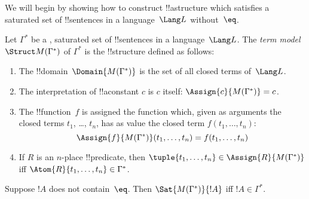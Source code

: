\documentclass[../../../include/open-logic-section]{subfiles}
\begin{document}


We will begin by showing how to construct !!a{structure} which
satisfies a
saturated set of !!{sentence}s in a language~$\Lang L$ without~$\eq$.

\begin{defn}
Let $\Gamma^*$ be a
,
saturated set of !!{sentence}s in a language~$\Lang L$. The \emph{term
  model}~$\Struct M(\Gamma^*)$ of $\Gamma^*$ is the !!{structure}
defined as follows:
\begin{enumerate}
\item The !!{domain}~$\Domain{M(\Gamma^*)}$ is the set of all closed terms
  of~$\Lang L$.
\item The interpretation of !!a{constant} $c$ is $c$ itself:
  $\Assign{c}{M(\Gamma^*)} = c$.
\item The !!{function}~$f$ is assigned the function which, given as
  arguments the closed terms $t_1$, \dots, $t_n$, has as value the
  closed term $f(t_1, \dots, t_n)$:
\[
\Assign{f}{M(\Gamma^*)}(t_1, \dots, t_n) = f(t_1,\dots, t_n)
\]
\item If $R$ is an $n$-place !!{predicate}, then $\tuple{t_1, \dots,
  t_n} \in \Assign{R}{M(\Gamma^*)}$ iff $\Atom{R}{t_1, \dots,
    t_n} \in \Gamma^*$.
\end{enumerate}
\end{defn}

\begin{lem}
 Suppose $!A$ does not contain~$\eq$. Then
$\Sat{M(\Gamma^*)}{!A}$ iff $!A \in \Gamma^*$.
\end{lem}
\end{document}
